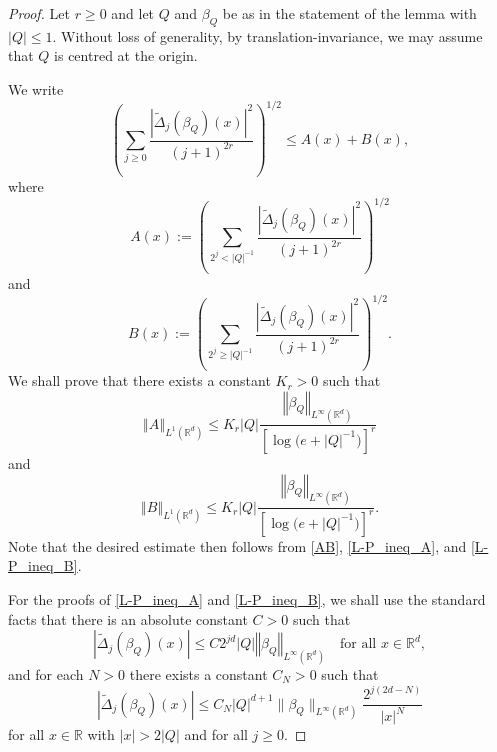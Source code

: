 \documentclass[a4paper, leqno, 10pt]{amsart}
\numberwithin{equation}{section}
\newcommand{\R}{\mathbb{R}}
\newcommand{\norm}[1]{\left\Vert#1\right\Vert}
\newcommand{\abs}[1]{\left|#1\right|}
\begin{document}
\begin{proof} Let $r \geq 0$ and let $Q$ and $\beta_Q$ be as in the statement of the lemma with $\abs{Q}\leq 1$.  Without loss of generality, by translation-invariance, we may assume that $Q$ is centred at the origin. 
	
We write
\begin{equation}\label{AB}
\left( \sum_{j \geq 0} \frac{ | \widetilde{\Delta}_j (\beta_Q) (x) |^2}{(j+1)^{2r}} \right)^{1/2} \leq A (x) + B(x),
\end{equation}
where
\[
A (x) := \left( \sum_{2^j < \abs{Q}^{-1}  } \frac{ | \widetilde{\Delta}_j (\beta_Q) (x)  |^2}{(j+1)^{2r}} \right)^{1/2}
\]
and
\[
B (x) := \left( \sum_{2^j \geq \abs{Q}^{-1} } \frac{ | \widetilde{\Delta}_j (\beta_Q) (x)  |^2}{(j+1)^{2r}} \right)^{1/2} . 
\]
We shall prove that there exists a constant $K_r>0$ such that
\begin{equation}\label{L-P_ineq_A}
\norm{ A }_{L^1 (\R^d)} \leq K_r | Q | \frac{ \norm{ \beta_Q }_{L^{\infty} (\R^d)} } { \left[ \log \big( e + | Q |^{-1}) \right]^r }
\end{equation}
and
\begin{equation}\label{L-P_ineq_B}
\norm{ B }_{L^1 (\R^d)} \leq K_r | Q |  \frac{ \norm{ \beta_Q }_{L^{\infty} (\R^d)} } { \left[ \log \big( e +  | Q |^{-1}  \big)  \right]^r }.
\end{equation}
Note that the desired estimate then follows from \eqref{AB}, \eqref{L-P_ineq_A}, and \eqref{L-P_ineq_B}. %
	
For the proofs of \eqref{L-P_ineq_A} and \eqref{L-P_ineq_B}, we shall use the standard facts that there is an absolute constant $C>0$ such that
\begin{equation}\label{proj_bound1}
| \widetilde{\Delta}_j (\beta_Q) (x) | \leq C 2^{jd} | Q | \norm{ \beta_Q }_{L^{\infty} (\R^d)} \quad \text{for all } x \in \R^d,
\end{equation}
and for each $N >0$ there exists a constant $C_N>0$ such that
\begin{equation}\label{proj_bound2}
| \widetilde{\Delta}_j (\beta_Q) (x) | \leq C_N
| Q |^{d+1} \| \beta_Q \|_{L^{\infty} (\R^d)} \frac{ 2^{j(2d-N)}} {|x|^N} 
\end{equation}
for all $x \in \R $ with $ |x| > 2|Q| $ and for all $j \geq 0$. 
	

\end{proof}
\end{document}
